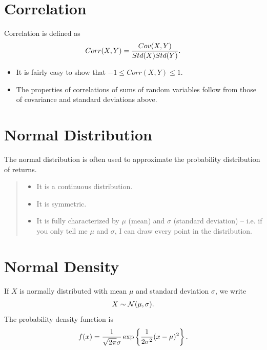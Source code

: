 \documentclass[letterpaper,10pt,english]{sphinxmanual}
\begin{document}
\section{Correlation}
\label{probability:correlation}
Correlation is defined as
\begin{gather}
\begin{split}Corr(X,Y) = \frac{Cov(X,Y)}{Std(X) Std(Y)}.\end{split}\notag
\end{gather}\begin{itemize}
\item {} 
It is fairly easy to show that $-1 \leq Corr(X,Y) \leq 1$.

\end{itemize}
\begin{itemize}
\item {} 
The properties of correlations of sums of random variables follow
from those of covariance and standard deviations above.

\end{itemize}


\section{Normal Distribution}
\label{probability:normal-distribution}
The normal distribution is often used to approximate the probability
distribution of returns.
\begin{quote}
\begin{itemize}
\item {} 
It is a continuous distribution.

\end{itemize}
\begin{itemize}
\item {} 
It is symmetric.

\end{itemize}
\begin{itemize}
\item {} 
It is fully characterized by $\mu$ (mean) and $\sigma$
(standard deviation) -- i.e. if you only tell me $\mu$ and
$\sigma$, I can draw every point in the distribution.

\end{itemize}
\end{quote}


\section{Normal Density}
\label{probability:normal-density}
If $X$ is normally distributed with mean $\mu$ and
standard deviation $\sigma$, we write
\begin{gather}
\begin{split}X \sim \mathcal{N}(\mu, \sigma).\end{split}\notag
\end{gather}
The probability density function is
\begin{gather}
\begin{split}f(x) = \frac{1}{\sqrt{2\pi} \sigma}
\exp\left\{\frac{1}{2\sigma^2}(x - \mu)^2\right\}.\end{split}\notag
\end{gather}
\end{document}
